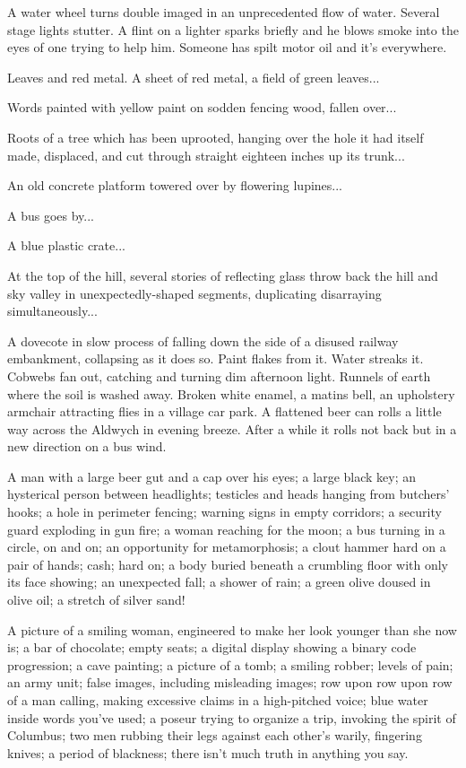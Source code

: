 \documentclass[
]{memoir}
\begin{document}
A water wheel turns double imaged in an unprecedented flow of water.
Several stage lights stutter. A flint on a lighter sparks briefly and he
blows smoke into the eyes of one trying to help him. Someone has spilt
motor oil and it's everywhere.

Leaves and red metal. A sheet of red metal, a field of green leaves...

Words painted with yellow paint on sodden fencing wood, fallen over...

Roots of a tree which has been uprooted, hanging over the hole it had
itself made, displaced, and cut through straight eighteen inches up its
trunk...

An old concrete platform towered over by flowering lupines...

A bus goes by...

A blue plastic crate...

At the top of the hill, several stories of reflecting glass throw back
the hill and sky valley in unexpectedly-shaped segments, duplicating
disarraying simultaneously...

A dovecote in slow process of falling down the side of a disused railway
embankment, collapsing as it does so. Paint flakes from it. Water
streaks it. Cobwebs fan out, catching and turning dim afternoon light.
Runnels of earth where the soil is washed away. Broken white enamel, a
matins bell, an upholstery armchair attracting flies in a village car
park. A flattened beer can rolls a little way across the Aldwych in
evening breeze. After a while it rolls not back but in a new direction
on a bus wind.

A man with a large beer gut and a cap over his eyes; a large black key;
an hysterical person between headlights; testicles and heads hanging
from butchers' hooks; a hole in perimeter fencing; warning signs in
empty corridors; a security guard exploding in gun fire; a woman
reaching for the moon; a bus turning in a circle, on and on; an
opportunity for metamorphosis; a clout hammer hard on a pair of hands;
cash; hard on; a body buried beneath a crumbling floor with only its
face showing; an unexpected fall; a shower of rain; a green olive doused
in olive oil; a stretch of silver sand!

A picture of a smiling woman, engineered to make her look younger than
she now is; a bar of chocolate; empty seats; a digital display showing a
binary code progression; a cave painting; a picture of a tomb; a smiling
robber; levels of pain; an army unit; false images, including misleading
images; row upon row upon row of a man calling, making excessive claims
in a high-pitched voice; blue water inside words you've used; a poseur
trying to organize a trip, invoking the spirit of Columbus; two men
rubbing their legs against each other's warily, fingering knives; a
period of blackness; there isn't much truth in anything you say.
\end{document}
